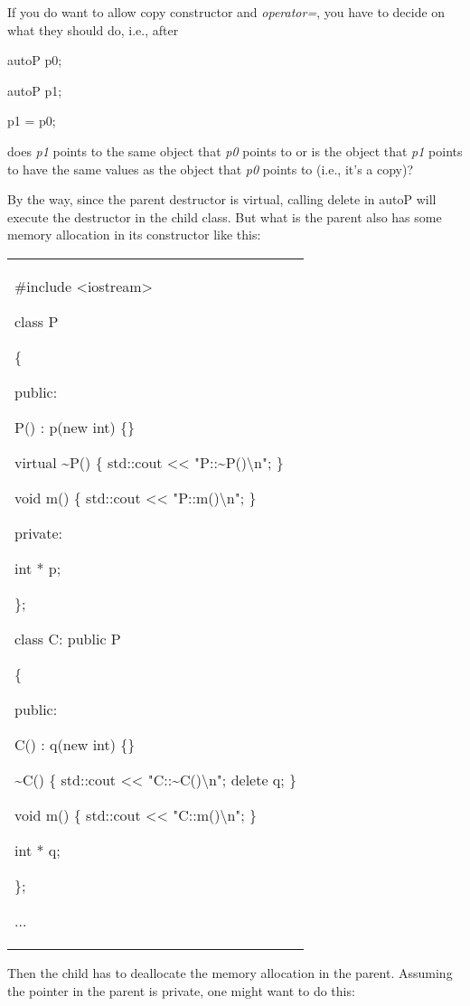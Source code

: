 \documentclass[
]{article}
\begin{document}
If you do want to allow copy constructor and \emph{operator=}, you have
to decide on what they should do, i.e., after

autoP p0;

autoP p1;

p1 = p0;

does \emph{p1} points to the same object that \emph{p0} points to or is
the object that \emph{p1} points to have the same values as the object
that \emph{p0} points to (i.e., it's a copy)?

By the way, since the parent destructor is virtual, calling delete in
autoP will execute the destructor in the child class. But what is the
parent also has some memory allocation in its constructor like this:

\begin{longtable}[]{@{}
  >{\raggedright\arraybackslash}p{}@{}}
\toprule\noalign{}
 \\
\midrule\noalign{}
\endhead
\bottomrule\noalign{}
\endlastfoot
\#include \textless iostream\textgreater{}

class P

\{

public:

P() : p(new int) \{\}

\textbf{ }virtual \textasciitilde P() \{ std::cout \textless\textless{}
"P::\textasciitilde P()\textbackslash n"; \}

void m() \{ std::cout \textless\textless{} "P::m()\textbackslash n"; \}

private:

int * p;

\};

class C: public P

\{

public:

C() : q(new int) \{\}

\textasciitilde C() \{ std::cout \textless\textless{}
"C::\textasciitilde C()\textbackslash n"; delete q; \}

void m() \{ std::cout \textless\textless{} "C::m()\textbackslash n"; \}

int * q;

\};

... \\
\end{longtable}

Then the child has to deallocate the memory allocation in the parent.
Assuming the pointer in the parent is private, one might want to do
this:
\end{document}

